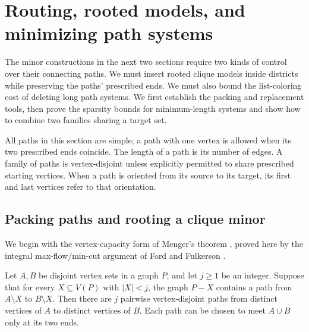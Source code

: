 \section{Routing, rooted models, and minimizing path systems}
\label{sec:routing}

The minor constructions in the next two sections require two kinds of
control over their connecting paths. We must insert rooted clique models
inside districts while preserving the paths' prescribed ends. We must also
bound the list-coloring cost of deleting long path systems. We first
establish the packing and replacement tools, then prove the sparsity bounds
for minimum-length systems and show how to combine two families sharing
a target set.

All paths in this section are simple; a path with one vertex is allowed when
its two prescribed ends coincide.  The length of a path is its number of
edges.  A family of paths is vertex-disjoint unless explicitly permitted to
share prescribed starting vertices.  When a path is oriented from its source
to its target, its first and last vertices refer to that orientation.

\subsection{Packing paths and rooting a clique minor}

We begin with the vertex-capacity form of Menger's theorem
\cite{menger1927}, proved here by the integral max-flow/min-cut argument
of Ford and Fulkerson \cite{fordfulkerson1956}.

\begin{lemma}\label{lem:packing}
Let $A,B$ be disjoint vertex sets in a graph $P$, and let $j\ge1$ be an
integer.  Suppose that for every $X\subseteq V(P)$ with $|X|<j$, the graph
$P-X$ contains a path from $A\setminus X$ to $B\setminus X$.
Then there are $j$ pairwise vertex-disjoint paths from distinct vertices of
$A$ to distinct vertices of $B$.  Each path can be chosen to meet $A\cup B$
only at its two ends.
\end{lemma}

